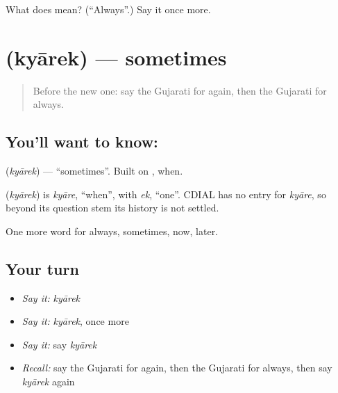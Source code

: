 \begin{tcolorbox}[breakable,colback=teal!4,colframe=teal!35!black,title={Before you move on}]
What does  mean? (\textquotedblleft{}Always\textquotedblright{}.) Say it once more.
\end{tcolorbox}
\section[\texorpdfstring{\gu{ક્યારેક} (kyārek)}{ક્યારેક (kyārek)}]{ (kyārek) — sometimes}

\label{lesson:GU-C77-sometimes}



\begin{quote}
Before the new one: say the Gujarati for again, then the Gujarati for always.
\end{quote}

\subsection*{You'll want to know: }
\textbf{} (\emph{kyārek}) — \textquotedblleft{}sometimes\textquotedblright{}. Built on \textbf{}, when.

\begin{cousinweb}
\textbf{} (\emph{kyārek}) is \emph{kyāre}, \textquotedblleft{}when\textquotedblright{}, with \emph{ek}, \textquotedblleft{}one\textquotedblright{}. CDIAL has no entry for \emph{kyāre}, so beyond its question stem its history is not settled.
\end{cousinweb}

\begin{grammarlens}[title={What you've built}]
One more word for always, sometimes, now, later.
\end{grammarlens}

\subsection*{Your turn}
\begin{itemize}
\raggedright
  \item \emph{Say it:} \emph{kyārek}
  \item \emph{Say it:} \emph{kyārek}, once more
  \item \emph{Say it:} say \emph{kyārek}
  \item \emph{Recall:} say the Gujarati for again, then the Gujarati for always, then say \emph{kyārek} again
\end{itemize}

